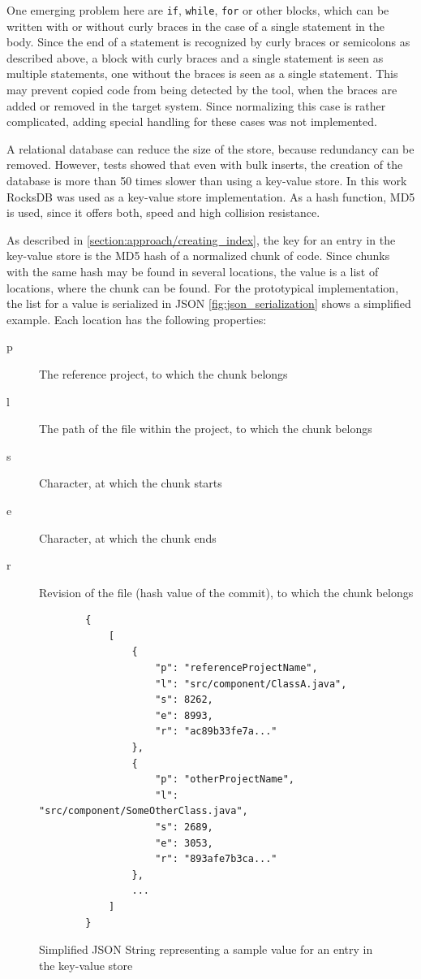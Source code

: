 One emerging problem here are \texttt{if}, \texttt{while}, \texttt{for} or other blocks, which can be written with or without curly braces in the case of a single statement in the body.
Since the end of a statement is recognized by curly braces or semicolons as described above, a block with curly braces and a single statement is seen as multiple statements, one without the braces is seen as a single statement.
This may prevent copied code from being detected by the tool, when the braces are added or removed in the target system.
Since normalizing this case is rather complicated, adding special handling for these cases was not implemented.

A relational database can reduce the size of the store, because redundancy can be removed.
However, tests showed that even with bulk inserts, the creation of the database is more than 50 times slower than using a key-value store.
In this work RocksDB was used as a key-value store implementation.
As a hash function, MD5 is used, since it offers both, speed and high collision resistance.

As described in \autoref{section:approach/creating_index}, the key for an entry in the key-value store is the MD5 hash of a normalized chunk of code.
Since chunks with the same hash may be found in several locations, the value is a list of locations, where the chunk can be found.
For the prototypical implementation, the list for a value is serialized in JSON
\autoref{fig:json_serialization} shows a simplified example.
Each location has the following properties:
\begin{description}
	\item[p] The reference project, to which the chunk belongs
	\item[l] The path of the file within the project, to which the chunk belongs
	\item[s] Character, at which the chunk starts
	\item[e] Character, at which the chunk ends
	\item[r] Revision of the file (hash value of the commit), to which the chunk belongs
\end{description}

\begin{figure}[h]
	\centering
	\begin{lstlisting}
		{
			[
				{
					"p": "referenceProjectName",
					"l": "src/component/ClassA.java",
					"s": 8262,
					"e": 8993,
					"r": "ac89b33fe7a..."
				},
				{
					"p": "otherProjectName",
					"l": "src/component/SomeOtherClass.java",
					"s": 2689,
					"e": 3053,
					"r": "893afe7b3ca..."
				},
				...
			]
		}
	\end{lstlisting}
	\caption{Simplified JSON String representing a sample value for an entry in the key-value store}\label{fig:json_serialization}
\end{figure}

